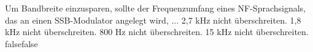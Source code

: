    {Um Bandbreite einzusparen, sollte der Frequenzumfang eines NF-Sprachsignals, das an einen SSB-Modulator angelegt wird, ...}
    {2,7 kHz nicht überschreiten.}
    {1,8 kHz nicht überschreiten.}
    {800 Hz nicht überschreiten.}
    {15 kHz nicht überschreiten.}
    {false}{false}